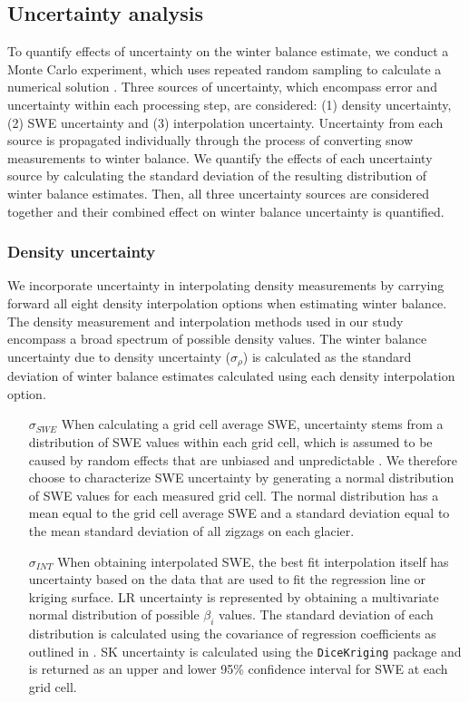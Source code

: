 \documentclass[review,oneside, letterpaper]{igs}
\begin{document}
\subsection{Uncertainty analysis}

To quantify effects of uncertainty on the winter balance estimate, we conduct a Monte Carlo experiment, which uses repeated random sampling to calculate a numerical solution \citep{Metropolis1949}. Three sources of uncertainty, which encompass error and uncertainty within each processing step, are considered: (1) density uncertainty, (2) SWE uncertainty and (3) interpolation uncertainty. Uncertainty from each source is propagated individually through the process of converting snow measurements to winter balance. We quantify the effects of each uncertainty source by calculating the standard deviation of the resulting distribution of winter balance estimates. Then, all three uncertainty sources are considered together and their combined effect on winter balance uncertainty is quantified.

\subsubsection{Density uncertainty}

We incorporate uncertainty in interpolating density measurements by carrying forward all eight density interpolation options when estimating winter balance. The density measurement and interpolation methods used in our study encompass a broad spectrum of possible density values. The winter balance uncertainty due to density uncertainty ($\sigma_{\rho}$) is calculated as the standard deviation of winter balance estimates calculated using each density interpolation option.

\begin{itemize}
\item[$\sigma_{SWE}$] When calculating a grid cell average SWE, uncertainty stems from a distribution of SWE values within each grid cell, which is assumed to be caused by random effects that are unbiased and unpredictable \citep{Watson2006}. We therefore choose to characterize SWE uncertainty by generating a normal distribution of SWE values for each measured grid cell. The normal distribution has a mean equal to the grid cell average SWE and a standard deviation equal to the mean standard deviation of all zigzags on each glacier.
\item[$\sigma_{INT}$] When obtaining interpolated SWE, the best fit interpolation itself has uncertainty based on the data that are used to fit the regression line or kriging surface. LR uncertainty is represented by obtaining a multivariate normal distribution of possible $\beta_i$ values. The standard deviation of each distribution is calculated using the covariance of regression coefficients as outlined in \cite{Bagos2015}. SK uncertainty is calculated using the \texttt{DiceKriging} package and is returned as an upper and lower 95\% confidence interval for SWE at each grid cell. 
\end{itemize}
 
\end{document}
